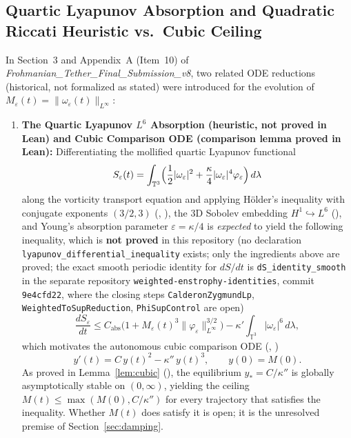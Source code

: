 \documentclass[11pt,a4paper]{article}
\theoremstyle{plain}
\theoremstyle{definition}
\theoremstyle{remark}
\newcommand{\T}{\mathbb{T}^3}
\begin{document}
\subsection{Quartic Lyapunov Absorption and Quadratic Riccati Heuristic vs.\ Cubic Ceiling}
In Section~3 and Appendix~A (Item~10) of \emph{Frohmanian\_Tether\_Final\_Submission\_v8}, two related ODE reductions (historical, not formalized as stated) were introduced for the evolution of $M_\varepsilon(t)=\|\omega_\varepsilon(t)\|_{L^\infty}$:
\begin{enumerate}
\item \textbf{The Quartic Lyapunov $L^6$ Absorption (heuristic, not proved in Lean) and Cubic Comparison ODE (comparison lemma proved in Lean):}
Differentiating the mollified quartic Lyapunov functional
\[
S_\varepsilon(t)=\int_{\T}\Bigl(\frac12|\omega_\varepsilon|^2+\frac{\kappa}{4}|\omega_\varepsilon|^4\varphi_\varepsilon\Bigr)\,d\lambda
\]
along the vorticity transport equation and applying Hölder's inequality with conjugate exponents $(3/2,3)$ (, ), the 3D Sobolev embedding $H^1\hookrightarrow L^6$ (), and Young's absorption parameter $\varepsilon=\kappa/4$ is \emph{expected} to yield the following inequality, which is \textbf{not proved} in this repository (no declaration \texttt{lyapunov\_differential\_inequality} exists; only the ingredients above are proved; the exact smooth periodic identity for $dS/dt$ is \texttt{dS\_identity\_smooth} in the separate repository \texttt{weighted-enstrophy-identities}, commit \texttt{9e4cfd22}, where the closing steps \texttt{CalderonZygmundLp}, \texttt{WeightedToSupReduction}, \texttt{PhiSupControl} are open)
\begin{equation}\label{eq:orig_dS}
\frac{dS_\varepsilon}{dt}\le C_{\mathrm{abs}}\bigl(1+M_\varepsilon(t)^3\|\varphi_\varepsilon\|_{L^\infty}^{3/2}\bigr)-\kappa'\int_{\T}|\omega_\varepsilon|^6\,d\lambda,
\end{equation}
which motivates the autonomous cubic comparison ODE (, )
\begin{equation}\label{eq:orig_cubic_ode}
y'(t) = C\,y(t)^2 - \kappa''\,y(t)^3,\qquad y(0)=M(0).
\end{equation}
As proved in Lemma~\ref{lem:cubic} (), the equilibrium $y_*=C/\kappa''$ is globally asymptotically stable on $(0,\infty)$, yielding the ceiling $M(t)\le\max(M(0),C/\kappa'')$ for every trajectory that satisfies the inequality. Whether $M(t)$ does satisfy it is open; it is the unresolved premise of Section~\ref{sec:damping}.

\end{enumerate}
\end{document}
